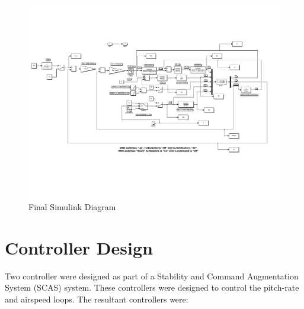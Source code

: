\documentclass[12pt]{article}
\begin{document}
\begin{figure}[b!]
\begin{center}
\includegraphics[width=1\textwidth]{figures/final_simulink}
\caption{Final Simulink Diagram}
\end{center}
\end{figure}

\clearpage
\section{Controller Design}
Two controller were designed as part of a Stability and Command Augmentation System (SCAS) system. These controllers were designed to control the pitch-rate and airspeed loops. The resultant controllers were:
\end{document}
